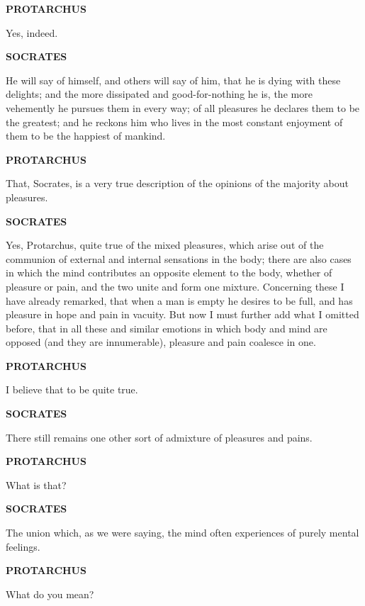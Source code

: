 \documentclass[11pt,letter]{article}
\begin{document}
\par \textbf{PROTARCHUS}
\par   Yes, indeed.

\par \textbf{SOCRATES}
\par   He will say of himself, and others will say of him, that he is dying with these delights; and the more dissipated and good-for-nothing he is, the more vehemently he pursues them in every way; of all pleasures he declares them to be the greatest; and he reckons him who lives in the most constant enjoyment of them to be the happiest of mankind.

\par \textbf{PROTARCHUS}
\par   That, Socrates, is a very true description of the opinions of the majority about pleasures.

\par \textbf{SOCRATES}
\par   Yes, Protarchus, quite true of the mixed pleasures, which arise out of the communion of external and internal sensations in the body; there are also cases in which the mind contributes an opposite element to the body, whether of pleasure or pain, and the two unite and form one mixture. Concerning these I have already remarked, that when a man is empty he desires to be full, and has pleasure in hope and pain in vacuity. But now I must further add what I omitted before, that in all these and similar emotions in which body and mind are opposed (and they are innumerable), pleasure and pain coalesce in one.

\par \textbf{PROTARCHUS}
\par   I believe that to be quite true.

\par \textbf{SOCRATES}
\par   There still remains one other sort of admixture of pleasures and pains.

\par \textbf{PROTARCHUS}
\par   What is that?

\par \textbf{SOCRATES}
\par   The union which, as we were saying, the mind often experiences of purely mental feelings.

\par \textbf{PROTARCHUS}
\par   What do you mean?
\end{document}
